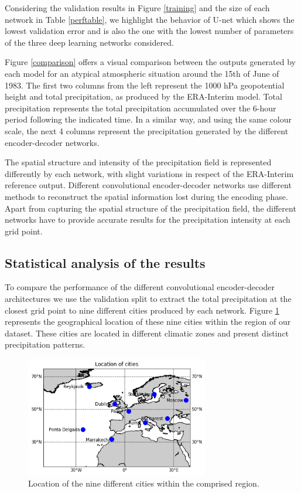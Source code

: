 \documentclass[twocol]{ametsoc}
\begin{document}
Considering the validation results in Figure \ref{training} and the size of each network in Table \ref{perftable}, we highlight the behavior of U-net which shows the lowest validation error and is also the one with the lowest number of parameters of the three deep learning networks considered. 

Figure \ref{comparison} offers a visual comparison between the outputs generated by each model for an atypical atmospheric situation around the 15th of June of 1983. The first two columns from the left represent the 1000 hPa geopotential height and total precipitation, as produced by the ERA-Interim model. Total precipitation represents the total precipitation accumulated over the 6-hour period following the indicated time. In a similar way, and using the same colour scale, the next 4 columns represent the precipitation generated by the different encoder-decoder networks.

The spatial structure and intensity of the precipitation field is represented differently by each network, with slight variations in respect of the ERA-Interim reference output. Different convolutional encoder-decoder networks use different methods to reconstruct the spatial information lost during the encoding phase. Apart from capturing the spatial structure of the precipitation field, the different networks have to provide accurate results for the precipitation intensity at each grid point.

\subsection{Statistical analysis of the results}
To compare the performance of the different convolutional encoder-decoder architectures we use the validation split to extract the total precipitation at the closest grid point to nine different cities produced by each network. Figure \ref{cities} represents the geographical location of these nine cities within the region of our dataset. These cities are located in different climatic zones and present distinct precipitation patterns.

\begin{figure}[h]
 \centerline{\includegraphics[width=8cm]{cities.png}}
  \caption{Location of the nine different cities within the comprised region.}\label{cities}
\end{figure}
\end{document}

